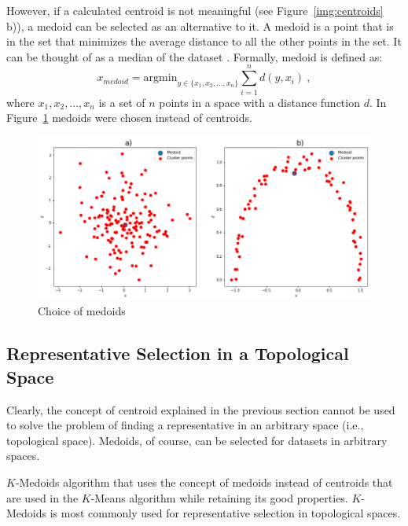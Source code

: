 \documentclass[thesis=B,english]{FITthesis}[2012/10/20]
\begin{document}
However, if a calculated centroid is not meaningful (see Figure~\ref{img:centroids} b)), a medoid can be selected as an alternative to it.
A medoid is a point that is in the set that minimizes the average distance to all the other points in the set.
It can be thought of as a median of the dataset .
Formally, medoid is defined as:
\begin{equation}
x_{medoid} = \mathrm{argmin}_{y \in \{x_1, x_2, ..., x_n\}} \sum_{i=1}^{n}{d(y, x_i)}\:,
\end{equation}
where $x_1, x_2, ..., x_n$ is a set of $n$ points in a space with a distance function $d$. 
In Figure~\ref{img:medoids} medoids were chosen instead of centroids.
\begin{figure}
  \includegraphics[width=\linewidth]{img/medoids.png}
  \caption{Choice of medoids}
  \label{img:medoids}
\end{figure}

\subsection{Representative Selection in a Topological Space}\label{sec:rep_select_arbitrary}
Clearly, the concept of centroid explained in the previous section cannot be used to solve the problem of finding a representative in an arbitrary space (i.e., topological space).
Medoids, of course, can be selected for datasets in arbitrary spaces.

$K$-Medoids algorithm that uses the concept of medoids instead of centroids that are used in the $K$-Means algorithm while retaining its good properties.
$K$-Medoids is most commonly used for representative selection in topological spaces.
\end{document}
